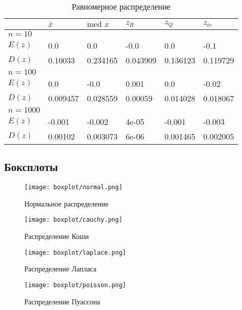 \documentclass[12pt,a4paper]{article}
\begin{document}
\begin{table}[h!]
	\centering
	\begin{tabular}{|l|l|l|l|l|l|}
		\hline&$\bar x$ &$\text{med }x$  &$z_R$  &$z_Q$  &$z_{tr}$  \\ \hline
		$n=10$&&&&& \\ \hline$E(z)$&0.0&0.0&-0.0&0.0&-0.1 \\ \hline$D(z)$&0.10033&0.234165&0.043909&0.136123&0.119729 \\ \hline
		
		$n=100$&&&&& \\ \hline$E(z)$&0.0&-0.0&0.001&0.0&-0.02 \\ \hline$D(z)$&0.009457&0.028559&0.00059&0.014028&0.018067 \\ \hline
		
		$n=1000$&&&&& \\ \hline$E(z)$&-0.001&-0.002&4e-05&-0.001&-0.003 \\ \hline$D(z)$&0.00102&0.003073&6e-06&0.001465&0.002005 \\ \hline
	\end{tabular}
	\caption{Равномерное распределение}
\end{table}
\pagebreak

\subsection{Боксплоты}
\begin{figure}[h!]
	\centering
	\texttt{[image: boxplot/normal.png]}
	\caption{Нормальное распределение}
	\label{fig:image}
\end{figure}

\begin{figure}[h!]\label{4}
	\centering
	\texttt{[image: boxplot/cauchy.png]}
	\caption{Распределение Коши}
	\label{fig:image:cauchy}
\end{figure}

\pagebreak

\begin{figure}[h!]
	\centering
	\texttt{[image: boxplot/laplace.png]}
	\caption{Распределение Лапласа}
	\label{fig:image}
\end{figure}

\begin{figure}[h!]
	\centering
	\texttt{[image: boxplot/poisson.png]}
	\caption{Распределение Пуассона}
	\label{fig:image}
\end{figure}

\pagebreak
\end{document}

